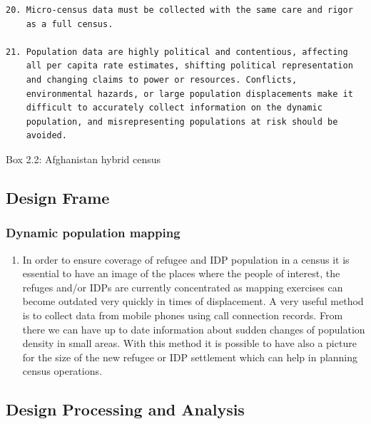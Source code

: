 \documentclass[
]{article}
\providecommand{\tightlist}{%
  \setlength{\itemsep}{0pt}\setlength{\parskip}{0pt}}
\begin{document}
\begin{verbatim}
20. Micro-census data must be collected with the same care and rigor
    as a full census.

21. Population data are highly political and contentious, affecting
    all per capita rate estimates, shifting political representation
    and changing claims to power or resources. Conflicts,
    environmental hazards, or large population displacements make it
    difficult to accurately collect information on the dynamic
    population, and misrepresenting populations at risk should be
    avoided.
\end{verbatim}

Box 2.2: Afghanistan hybrid census

\hypertarget{design-frame-2}{%
\subsection{Design Frame}\label{design-frame-2}}

\hypertarget{a.-dynamic-population-mapping}{%
\subsubsection{Dynamic population mapping}\label{a.-dynamic-population-mapping}}

\begin{enumerate}
\def\labelenumi{\arabic{enumi}.}
\setcounter{enumi}{106}
\tightlist
\item
  In order to ensure coverage of refugee and IDP population in a
  census it is essential to have an image of the places where the
  people of interest, the refuges and/or IDPs are currently
  concentrated as mapping exercises can become outdated very quickly
  in times of displacement. A very useful method is to collect data
  from mobile phones using call connection records. From there we can
  have up to date information about sudden changes of population
  density in small areas. With this method it is possible to have also
  a picture for the size of the new refugee or IDP settlement which
  can help in planning census operations.
\end{enumerate}

\hypertarget{design-processing-and-analysis-1}{%
\subsection{Design Processing and Analysis}\label{design-processing-and-analysis-1}}
\end{document}
